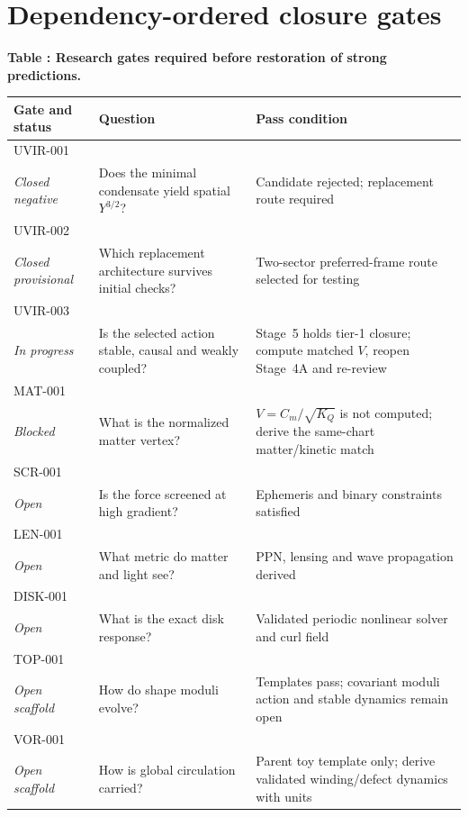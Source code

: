 \clearpage
\section{Dependency-ordered closure gates}

\begin{center}
\small
\textbf{Table \thetable: Research gates required before restoration of strong predictions.}\par\smallskip
\begin{tabular}{@{}p{}p{}p{}@{}}
\toprule
Gate and status & Question & Pass condition \\
\midrule
UVIR-001\\\textit{Closed negative} & Does the minimal condensate yield spatial $Y^{3/2}$? & Candidate rejected; replacement route required \\
UVIR-002\\\textit{Closed provisional} & Which replacement architecture survives initial checks? & Two-sector preferred-frame route selected for testing \\
UVIR-003\\\textit{In progress} & Is the selected action stable, causal and weakly coupled? & Stage~5 holds tier-1 closure; compute matched $V$, reopen Stage~4A and re-review \\
MAT-001\\\textit{Blocked} & What is the normalized matter vertex? & $V=C_m/\sqrt{K_Q}$ is not computed; derive the same-chart matter/kinetic match \\
SCR-001\\\textit{Open} & Is the force screened at high gradient? & Ephemeris and binary constraints satisfied \\
LEN-001\\\textit{Open} & What metric do matter and light see? & PPN, lensing and wave propagation derived \\
DISK-001\\\textit{Open} & What is the exact disk response? & Validated periodic nonlinear solver and curl field \\
TOP-001\\\textit{Open scaffold} & How do shape moduli evolve? & Templates pass; covariant moduli action and stable dynamics remain open \\
VOR-001\\\textit{Open scaffold} & How is global circulation carried? & Parent toy template only; derive validated winding/defect dynamics with units \\

\end{tabular}
\end{center}
